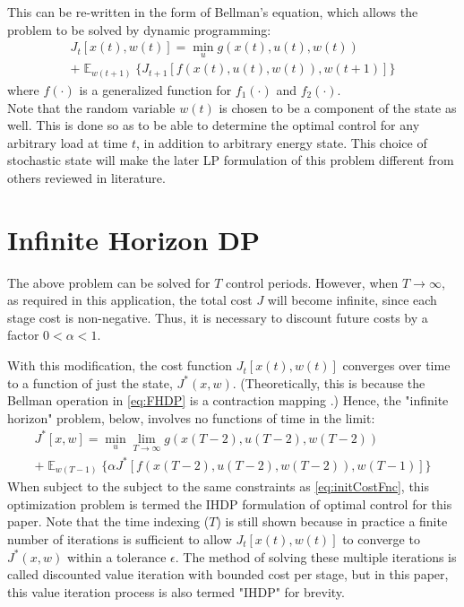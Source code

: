 \documentclass[conference]{IEEEtran}
\DeclareMathOperator{\E}{\mathbb{E}}
\begin{document}
This can be re-written in the form of Bellman's equation, which allows the problem to be solved by dynamic programming:
\begin{multline} \label{eq:FHDP}
J_{t}[x(t),w(t)]=\min_{u} g(x(t),u(t),w(t))\\ + \mathop{\E}_{w(t+1)} \{J_{t+1}[f(x(t),u(t),w(t)),w(t+1)]\}
\end{multline}
where $f(\cdot)$ is a generalized function for $f_{1}(\cdot)$ and $f_{2}(\cdot)$.\\
Note that the random variable $w(t)$ is chosen to be a component of the state as well. This is done so as to be able to determine the optimal control for any arbitrary load at time $t$, in addition to arbitrary energy state. This choice of stochastic state will make the later LP formulation of this problem different from others reviewed in literature.

\section{Infinite Horizon DP}
The above problem can be solved for $T$ control periods. However, when $T\to\infty$, as required in this application, the total cost $J$ will become infinite, since each stage cost is non-negative. Thus, it is necessary to discount future costs by a factor $0<\alpha<1$.

With this modification, the cost function $J_{t}[x(t),w(t)]$ converges over time to a function of just the state, $J^{*}(x,w)$. (Theoretically, this is because the Bellman operation in \eqref{eq:FHDP} is a contraction mapping \cite{bertsekas1995dynamic}.) Hence, the "infinite horizon" problem, below, involves no functions of time in the limit:
\begin{multline} \label{eq:IHDP}
J^{*}[x,w]=\min_{u} \lim_{T\to\infty} g(x(T-2),u(T-2),w(T-2))\\
+\mathop{\E}_{w(T-1)} \{\alpha J^{*}[f(x(T-2),u(T-2),w(T-2)),w(T-1)]
\}
\end{multline}
When subject to the subject to the same constraints as \eqref{eq:initCostFnc}, this optimization problem is termed the IHDP formulation of optimal control for this paper. Note that the time indexing ($T$) is still shown because in practice a finite number of iterations is sufficient to allow $J_{t}[x(t),w(t)]$ to converge to $J^{*}(x,w)$ within a tolerance $\epsilon$. The method of solving these multiple iterations is called discounted value iteration with bounded cost per stage, but in this paper, this value iteration process is also termed "IHDP" for brevity.
\end{document}
